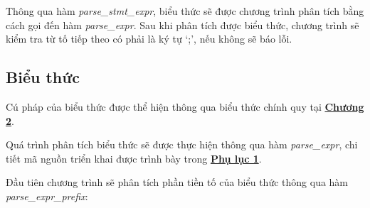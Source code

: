 Thông qua hàm \textit{parse\_stmt\_expr}, biểu thức sẽ được chương trình phân tích bằng cách gọi đến hàm \textit{parse\_expr}. Sau khi phân tích được biểu thức, chương trình sẽ kiểm tra từ tố tiếp theo có phải là ký tự `;', nếu không sẽ báo lỗi.

\subsection{Biểu thức}
Cú pháp của biểu thức được thể hiện thông qua biểu thức chính quy tại \hyperref[ch2:expr]{\bf Chương 2}.

Quá trình phân tích biểu thức sẽ được thực hiện thông qua hàm \textit{parse\_expr}, chi tiết mã nguồn triển khai được trình bày trong \hyperref[ap1:expr]{\bf Phụ lục 1}. %

Đầu tiên chương trình sẽ phân tích phần tiền tố của biểu thức thông qua hàm \\\textit{parse\_expr\_prefix}:
